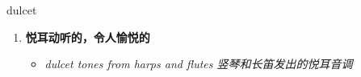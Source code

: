 
\begin{frame}
{\huge dulcet}
\begin{center}
\begin{enumerate}\Large
  \item \textbf{悦耳动听的，令人愉悦的}
  \begin{itemize}
    \item \em{\Large{dulcet tones from harps and flutes 竖琴和长笛发出的悦耳音调}}
  \end{itemize}
\end{enumerate}
\end{center}
\end{frame}
